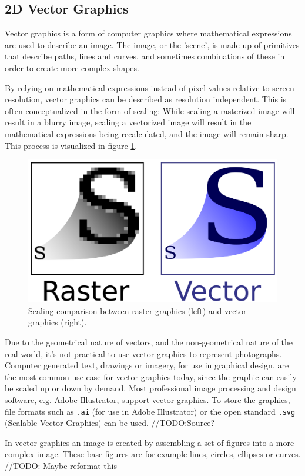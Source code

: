 \subsection{2D Vector Graphics}
Vector graphics is a form of computer graphics where mathematical expressions are used to describe an image. 
The image, or the 'scene', is made up of primitives that describe paths, lines and curves, and sometimes combinations of these in order to create more complex shapes.

By relying on mathematical expressions instead of pixel values relative to screen resolution, vector graphics can be described as resolution independent. 
This is often conceptualized in the form of scaling: While scaling a rasterized image will result in a blurry image, scaling a vectorized image will result in the mathematical expressions being recalculated, and the image will remain sharp. 
This process is visualized in figure \ref{fig:vectorscaling}.

\begin{figure}[h!]
\centering \includegraphics[width=0.5\linewidth]{images/bm_vs_svg.png}
\caption{Scaling comparison between raster graphics (left) and vector graphics (right)\cite{svg}.}
\label{fig:vectorscaling}
\end{figure}

Due to the geometrical nature of vectors, and the non-geometrical nature of the real world, it's not practical to use vector graphics to represent photographs. 
Computer generated text, drawings or imagery, for use in graphical design, are the most common use case for vector graphics today, since the graphic can easily be scaled up or down by demand. 
Most professional image processing and design software, e.g. Adobe Illustrator, support vector graphics. 
To store the graphics, file formats such as \texttt{.ai} (for use in Adobe Illustrator) or the open standard \texttt{.svg} (Scalable Vector Graphics) can be used. //TODO:Source?

In vector graphics an image is created by assembling a set of figures into a more complex image.
These base figures are for example lines, circles, ellipses or curves. //TODO: Maybe reformat this

